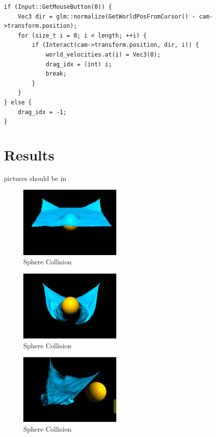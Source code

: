 \documentclass[acmtog]{acmart}
\begin{document}
\begin{enumerate}
\begin{lstlisting}
if (Input::GetMouseButton(0)) {
	Vec3 dir = glm::normalize(GetWorldPosFromCursor() - cam->transform.position);
	for (size_t i = 0; i < length; ++i) {
		if (Interact(cam->transform.position, dir, i)) {
			world_velocities.at(i) = Vec3(0);
			drag_idx = (int) i;
			break;
		}
	}
} else {
	drag_idx = -1;
}
	\end{lstlisting} 
	
\end{enumerate}
\section{Results}
pictures should be in
\begin{figure}[H]
	\centering
	\includegraphics[width=0.45\textwidth]{images/1.png}
	\caption{Sphere Collision}
\end{figure}
\begin{figure}[H]
	\centering
	\includegraphics[width=0.45\textwidth]{images/2.png}
	\caption{Sphere Collision}
\end{figure}
\begin{figure}[H]
	\centering
	\includegraphics[width=0.45\textwidth]{images/3.png}
	\caption{Sphere Collision}
\end{figure}
\end{document}
